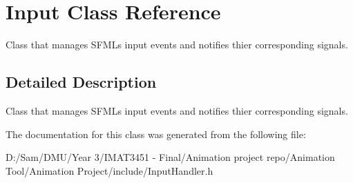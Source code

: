 \hypertarget{class_input}{}\section{Input Class Reference}
\label{class_input}


Class that manages S\+F\+ML\textquotesingle{}s input events and notifies thier corresponding signals.  




\subsection{Detailed Description}
Class that manages S\+F\+ML\textquotesingle{}s input events and notifies thier corresponding signals. 

The documentation for this class was generated from the following file\+:\begin{DoxyCompactItemize}
\item 
D\+:/\+Sam/\+D\+M\+U/\+Year 3/\+I\+M\+A\+T3451 -\/ Final/\+Animation project repo/\+Animation Tool/\+Animation Project/include/Input\+Handler.\+h\end{DoxyCompactItemize}
